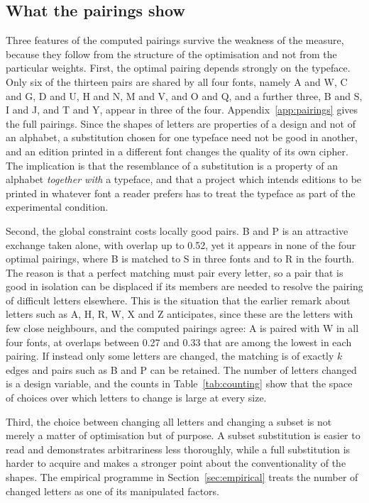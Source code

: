 \subsection{What the pairings show}

Three features of the computed pairings survive the weakness of the measure, because they follow from the structure of the optimisation and not from the particular weights. First, the optimal pairing depends strongly on the typeface. Only six of the thirteen pairs are shared by all four fonts, namely A and W, C and G, D and U, H and N, M and V, and O and Q, and a further three, B and S, I and J, and T and Y, appear in three of the four. Appendix~\ref{app:pairings} gives the full pairings. Since the shapes of letters are properties of a design and not of an alphabet, a substitution chosen for one typeface need not be good in another, and an edition printed in a different font changes the quality of its own cipher. The implication is that the resemblance of a substitution is a property of an alphabet \emph{together with} a typeface, and that a project which intends editions to be printed in whatever font a reader prefers has to treat the typeface as part of the experimental condition.

Second, the global constraint costs locally good pairs. B and P is an attractive exchange taken alone, with overlap up to 0.52, yet it appears in none of the four optimal pairings, where B is matched to S in three fonts and to R in the fourth. The reason is that a perfect matching must pair every letter, so a pair that is good in isolation can be displaced if its members are needed to resolve the pairing of difficult letters elsewhere. This is the situation that the earlier remark about letters such as A, H, R, W, X and Z anticipates, since these are the letters with few close neighbours, and the computed pairings agree: A is paired with W in all four fonts, at overlaps between 0.27 and 0.33 that are among the lowest in each pairing. If instead only some letters are changed, the matching is of exactly $k$ edges and pairs such as B and P can be retained. The number of letters changed is a design variable, and the counts in Table~\ref{tab:counting} show that the space of choices over which letters to change is large at every size.

Third, the choice between changing all letters and changing a subset is not merely a matter of optimisation but of purpose. A subset substitution is easier to read and demonstrates arbitrariness less thoroughly, while a full substitution is harder to acquire and makes a stronger point about the conventionality of the shapes. The empirical programme in Section~\ref{sec:empirical} treats the number of changed letters as one of its manipulated factors.
